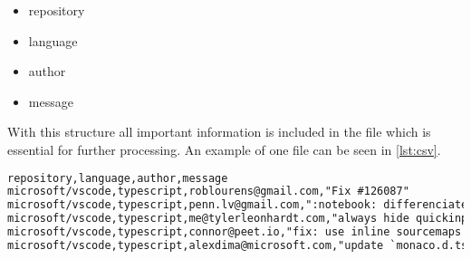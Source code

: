 \begin{itemize}
  \item repository
  \item language
  \item author
  \item message
\end{itemize}

With this structure all important information is included in the file which is
essential for further processing. An example of one file can be seen in
\autoref{lst:csv}.

\begin{lstlisting}[language=xml, label={lst:csv}, caption={Excerpt of \textit{typescript.csv} with commits from the repository \textit{microsoft/vscode}}]
repository,language,author,message
microsoft/vscode,typescript,roblourens@gmail.com,"Fix #126087"
microsoft/vscode,typescript,penn.lv@gmail.com,":notebook: differenciate editor focus and list view focus"
microsoft/vscode,typescript,me@tylerleonhardt.com,"always hide quickinput on iPad when focus is lost fixes #125284"
microsoft/vscode,typescript,connor@peet.io,"fix: use inline sourcemaps in watch task"
microsoft/vscode,typescript,alexdima@microsoft.com,"update `monaco.d.ts`"
\end{lstlisting}
